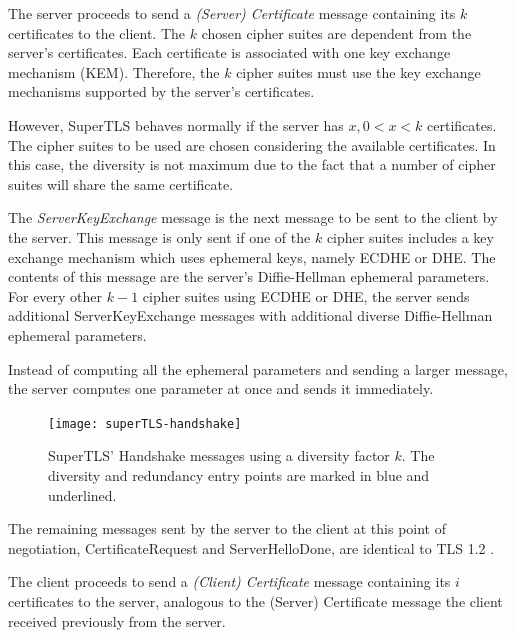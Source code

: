 \documentclass{sig-alternate-05-2015}
\begin{document}
The server proceeds to send a \textit{(Server) Certificate} message containing its $k$ certificates to the client. The $k$ chosen cipher suites are dependent from the server's certificates. Each certificate is associated with one key exchange mechanism (KEM). Therefore, the $k$ cipher suites must use the key exchange mechanisms supported by the server's certificates.

However, SuperTLS behaves normally if the server has $x, 0 < x < k$ certificates. The cipher suites to be used are chosen considering the available certificates. In this case, the diversity is not maximum due to the fact that a number of cipher suites will share the same certificate.

The \textit{ServerKeyExchange} message is the next message to be sent to the client by the server. This message is only sent if one of the $k$ cipher suites includes a key exchange mechanism which uses ephemeral keys, namely ECDHE or DHE. The contents of this message are the server's Diffie-Hellman ephemeral parameters. For every other $k - 1$ cipher suites using ECDHE or DHE, the server sends additional ServerKeyExchange messages with additional diverse Diffie-Hellman ephemeral parameters.

Instead of computing all the ephemeral parameters and sending a larger message, the server computes one parameter at once and sends it immediately.

\begin{figure}[t]
\texttt{[image: superTLS-handshake]}
\centering
\caption{SuperTLS' Handshake messages using a diversity factor $k$. The diversity and redundancy entry points are marked in blue and underlined.}
\label{fig:superTLS-example}
\end{figure}


The remaining messages sent by the server to the client at this point of negotiation, CertificateRequest and ServerHelloDone, are identical to TLS 1.2 \cite{TLS1.2-5246}.

The client proceeds to send a \textit{(Client) Certificate} message containing its $i$ certificates to the server, analogous to the (Server) Certificate message the client received previously from the server.
\end{document}
